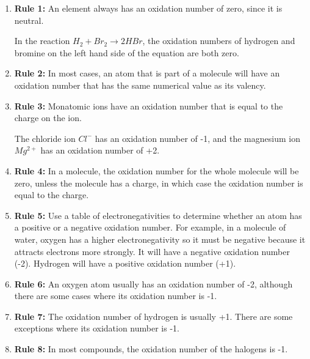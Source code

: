 \begin{enumerate}
\item{\textbf{Rule 1:} An element always has an oxidation number of zero, since it is neutral.

In the reaction \rm${H_{2} + Br_{2} \rightarrow 2HBr}$, the oxidation numbers of hydrogen and bromine on the left hand side of the equation are both zero. 
}

\item{\textbf{Rule 2:} In most cases, an atom that is part of a molecule will have an oxidation number that has the same numerical value as its valency.}

\item{\textbf{Rule 3:} Monatomic ions have an oxidation number that is equal to the charge on the ion. 

The chloride ion $Cl^{-}$ has an oxidation number of -1, and the magnesium ion $Mg^{2+}$ has an oxidation number of +2. 
}
\item{\textbf{Rule 4:} In a molecule, the oxidation number for the whole molecule will be zero, unless the molecule has a charge, in which case the oxidation number is equal to the charge.}

\item{\textbf{Rule 5:} Use a table of electronegativities to determine whether an atom has a positive or a negative oxidation number. For example, in a molecule of water, oxygen has a higher electronegativity so it must be negative because it attracts electrons more strongly. It will have a negative oxidation number (-2). Hydrogen will have a positive oxidation number (+1).}

\item{\textbf{Rule 6:} An oxygen atom usually has an oxidation number of -2, although there are some cases where its oxidation number is -1.}

\item{\textbf{Rule 7:} The oxidation number of hydrogen is usually +1. There are some exceptions where its oxidation number is -1.}

\item{\textbf{Rule 8:} In most compounds, the oxidation number of the halogens is -1.}

\end{enumerate}


